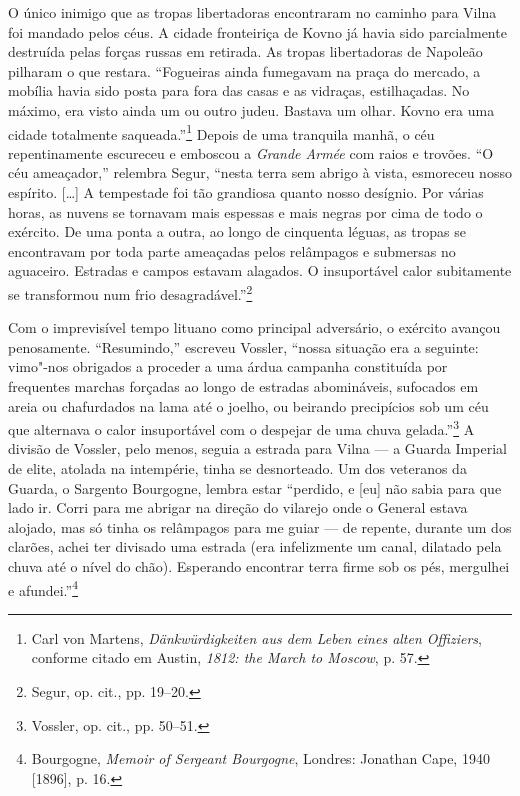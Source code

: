 O único inimigo que as tropas libertadoras encontraram no caminho para
Vilna foi mandado pelos céus. A cidade fronteiriça de Kovno já havia
sido parcialmente destruída pelas forças russas em retirada. As tropas
libertadoras de Napoleão pilharam o que restara. ``Fogueiras ainda
fumegavam na praça do mercado, a mobília havia sido posta para fora das
casas e as vidraças, estilhaçadas. No máximo, era visto ainda um ou
outro judeu. Bastava um olhar. Kovno era uma cidade totalmente
saqueada.''\footnote{Carl von Martens, \textit{Dänkwürdigkeiten aus dem Leben eines alten Offiziers}, conforme citado em Austin, \textit{1812: the March to Moscow}, p. 57.} Depois de uma tranquila manhã, o céu repentinamente escureceu e emboscou a \textit{Grande Armée} com raios e
trovões. ``O céu ameaçador,'' relembra Segur, ``nesta terra sem abrigo à
vista, esmoreceu nosso espírito. [\ldots{}] A tempestade foi tão grandiosa
quanto nosso desígnio. Por várias horas, as nuvens se tornavam mais
espessas e mais negras por cima de todo o exército. De uma ponta a
outra, ao longo de cinquenta léguas, as tropas se encontravam por toda
parte ameaçadas pelos relâmpagos e submersas no aguaceiro. Estradas e
campos estavam alagados. O insuportável calor subitamente se transformou
num frio desagradável.''\footnote{Segur, op. cit., pp. 19--20.}

Com o imprevisível tempo lituano como principal adversário, o exército
avançou penosamente. ``Resumindo,'' escreveu Vossler, ``nossa situação
era a seguinte: vimo"-nos obrigados a proceder a uma árdua campanha
constituída por frequentes marchas forçadas ao longo de estradas
abomináveis, sufocados em areia ou chafurdados na lama até o joelho, ou
beirando precipícios sob um céu que alternava o calor insuportável com o
despejar de uma chuva gelada.''\footnote{Vossler, op. cit., pp. 50--51.}
A divisão de Vossler, pelo menos, seguia a estrada para Vilna --- a Guarda
Imperial de elite, atolada na intempérie, tinha se desnorteado. Um dos
veteranos da Guarda, o Sargento Bourgogne, lembra estar ``perdido, e
{[}eu{]} não sabia para que lado ir. Corri para me abrigar na direção do
vilarejo onde o General estava alojado, mas só tinha os relâmpagos para
me guiar --- de repente, durante um dos clarões, achei ter divisado uma
estrada (era infelizmente um canal, dilatado pela chuva até o nível do
chão). Esperando encontrar terra firme sob os pés, mergulhei e
afundei.''\footnote{Bourgogne, \textit{Memoir of Sergeant Bourgogne}, Londres: Jonathan Cape, 1940 {[}1896{]}, p. 16.}

